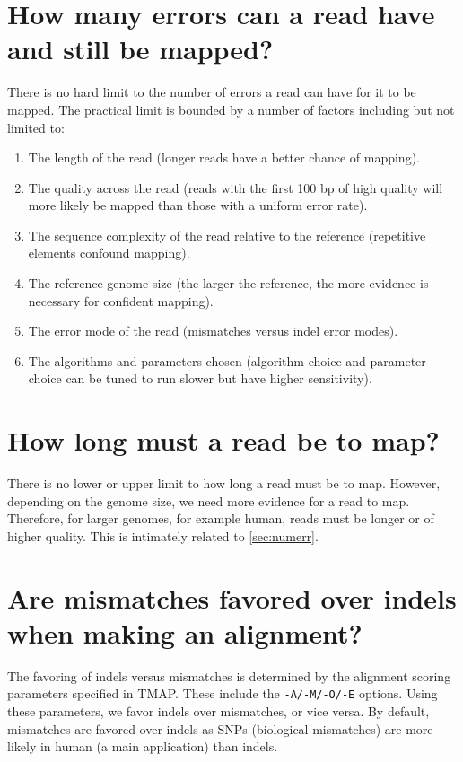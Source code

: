 \documentclass[a4paper,12pt]{book}
\newcommand{\TT}[1]{{\tt #1}} %
\begin{document}
\section{How many errors can a read have and still be mapped?}
\label{sec:numerr}

There is no hard limit to the number of errors a read can have for it to be mapped.
The practical limit is bounded by a number of factors including but not limited to:
\begin{enumerate}
	\item The length of the read (longer reads have a better chance of mapping).
	\item The quality across the read (reads with the first 100 bp of high quality will more likely be mapped than those with a uniform error rate).
	\item The sequence complexity of the read relative to the reference (repetitive elements confound mapping).
	\item The reference genome size (the larger the reference, the more evidence is necessary for confident mapping).
	\item The error mode of the read (mismatches versus indel error modes).
	\item The algorithms and parameters chosen (algorithm choice and parameter choice can be tuned to run slower but have higher sensitivity).
\end{enumerate}
		
\section{How long must a read be to map?}

There is no lower or upper limit to how long a read must be to map.
However, depending on the genome size, we need more evidence for a read to map.  
Therefore, for larger genomes, for example human, reads must be longer or of higher quality.
This is intimately related to \autoref{sec:numerr}.

\section{Are mismatches favored over indels when making an alignment?}

The favoring of indels versus mismatches is determined by the alignment
scoring parameters specified in TMAP.  
These include the \TT{-A/-M/-O/-E} options.  
Using these parameters, we favor indels over mismatches, or vice versa.  
By default, mismatches are favored over indels as SNPs (biological mismatches) are more likely in human (a main application) than indels.
\end{document}
